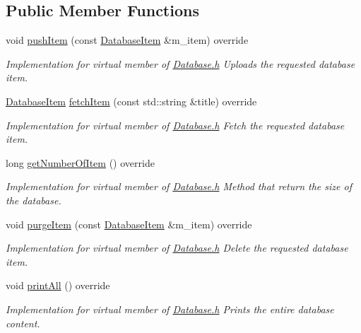 \subsection*{Public Member Functions}
\begin{DoxyCompactItemize}
\item 
void \hyperlink{classMovieDatabase_a203b9b5c1b325997ce519859a436b6ce}{push\+Item} (const \hyperlink{classDatabaseItem}{Database\+Item} \&m\+\_\+item) override
\begin{DoxyCompactList}\small\item\em Implementation for virtual member of \hyperlink{Database_8h_source}{Database.\+h} Uploads the requested database item. \end{DoxyCompactList}\item 
\hyperlink{classDatabaseItem}{Database\+Item} \hyperlink{classMovieDatabase_ac0bb39b8be599ffea76081809ae42dda}{fetch\+Item} (const std\+::string \&title) override
\begin{DoxyCompactList}\small\item\em Implementation for virtual member of \hyperlink{Database_8h_source}{Database.\+h} Fetch the requested database item. \end{DoxyCompactList}\item 
long \hyperlink{classMovieDatabase_a9a386f51dd72d63414a124cbcfcd879b}{get\+Number\+Of\+Item} () override
\begin{DoxyCompactList}\small\item\em Implementation for virtual member of \hyperlink{Database_8h_source}{Database.\+h} Method that return the size of the database. \end{DoxyCompactList}\item 
void \hyperlink{classMovieDatabase_a85faa4c33b3ab2dc0d1f4939bb034797}{purge\+Item} (const \hyperlink{classDatabaseItem}{Database\+Item} \&m\+\_\+item) override
\begin{DoxyCompactList}\small\item\em Implementation for virtual member of \hyperlink{Database_8h_source}{Database.\+h} Delete the requested database item. \end{DoxyCompactList}\item 
void \hyperlink{classMovieDatabase_af1e13b6fc0fd7186e98edbe2cf187618}{print\+All} () override
\begin{DoxyCompactList}\small\item\em Implementation for virtual member of \hyperlink{Database_8h_source}{Database.\+h} Prints the entire database content. \end{DoxyCompactList}\end{DoxyCompactItemize}
